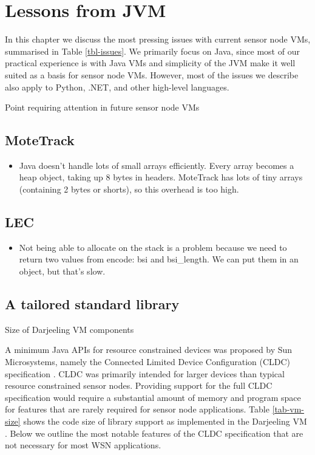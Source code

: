 \chapter{Lessons from JVM}
In this chapter we discuss the most pressing issues with current sensor node VMs, summarised in Table \ref{tbl-issues}. We primarily focus on Java, since most of our practical experience is with Java VMs and simplicity of the JVM make it well suited as a basis for sensor node VMs. However, most of the issues we describe also apply to Python, .NET, and other high-level languages.

\begin{table*}
    \centering
    \caption{Point requiring attention in future sensor node VMs}
    \scriptsize
    \label{tbl-issues}
    
\end{table*}


\section{MoteTrack}
\begin{itemize}
	\item Java doesn't handle lots of small arrays efficiently. Every array becomes a heap object, taking up 8 bytes in headers. MoteTrack has lots of tiny arrays (containing 2 bytes or shorts), so this overhead is too high.
\end{itemize}

\section{LEC}
\begin{itemize}
	\item Not being able to allocate on the stack is a problem because we need to return two values from encode: bsi and bsi\_length. We can put them in an object, but that's slow.
\end{itemize}

\section{A tailored standard library}
\label{sec-std-lib}
\begin{table*}
    \centering
    \caption{Size of Darjeeling VM components}
    \scriptsize
    \label{tab-vm-size}
     
\end{table*}

A minimum Java APIs for resource constrained devices was proposed by Sun Microsystems, namely the Connected Limited Device Configuration (CLDC) specification \cite{CLDC}.  CLDC was primarily intended for larger devices than typical resource constrained sensor nodes.  Providing support for the full CLDC specification would require a substantial amount of memory and program space for features that are rarely required for sensor node applications. Table \ref{tab-vm-size} shows the code size of library support as implemented in the Darjeeling VM \cite{Brouwers:2009cj}.  Below we outline the most notable features of the CLDC specification that are not necessary for most WSN applications.

